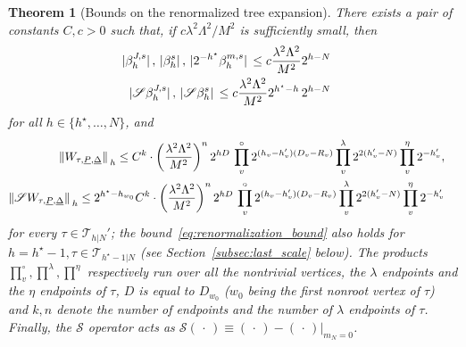 \documentclass[a4paper, 11pt]{article}
\newcommand{\cutoff}{\Lambda}								%
\newcommand{\trees}{\mathcal{T}}							%
\theoremstyle{thm}
\newtheorem{theorem}{Theorem}
\begin{document}
\begin{theorem}[Bounds on the renormalized tree expansion]
\label{th:renormalization_bound}
There exists a pair of constants $C, c > 0$ such that, if $c \lambda^2 \cutoff^2/M^2$ is sufficiently small, then
\begin{align}
\begin{split}
\label{eq:boundedness_beta_functions}
\abs*{\beta^{J, s}_h}, \, \abs*{\beta^s_h}, \, \abs*{2^{-h^\star} \beta^{m, s}_h} & \le c \frac{\lambda^2 \cutoff^2}{M^2} 2^{h - N}
\end{split} \\
\begin{split}
\label{eq:boundedness_beta_functions_zero_mass}
\abs*{\mathscr{S} \beta^{J, s}_h}, \, \abs*{\mathscr{S} \beta^s_h} & \le c \frac{\lambda^2 \cutoff^2}{M^2} 2^{h^\star - h} \, 2^{h - N}
\end{split}
\end{align}
for all $h \in \lbrace h^\star, \dots, N \rbrace$, and
\begin{align}
\begin{split}
\label{eq:renormalization_bound}
\norm*{W_{\tau, \underline{P}, \underline{\Delta}}}_h & \le C^k \cdot \left( \frac{\lambda^2 \cutoff^2}{M^2} \right)^n 2^{hD} \, \prod_v^\circ 2^{(h_v - h'_v)(D_v - R_v)} \prod^\lambda_v 2^{2(h'_v - N)} \prod^\eta_v 2^{-h'_v},
\end{split} \\
\begin{split}
\label{eq:renormalization_bound_zero_mass}
\norm*{\mathscr{S} W_{\tau, \underline{P}, \underline{\Delta}}}_h & \le 2^{h^\star - h_{w_0}} C^k \cdot \left( \frac{\lambda^2 \cutoff^2}{M^2} \right)^n 2^{hD} \, \prod_v^\circ 2^{(h_v - h'_v)(D_v - R_v)} \prod^\lambda_v 2^{2(h'_v - N)} \prod^\eta_v 2^{-h'_v}
\end{split}
\end{align}
for every $\tau \in \trees_{h|N}'$; the bound~\eqref{eq:renormalization_bound} also holds for $h = h^\star - 1, \tau \in \trees_{h^\star - 1|N}$ (see Section~\ref{subsec:last_scale} below). The products $\prod_v^\circ, \prod^\lambda, \prod^\eta$ respectively run over all the nontrivial vertices, the $\lambda$ endpoints and the $\eta$ endpoints of $\tau$, $D$ is equal to $D_{w_0}$ ($w_0$ being the first nonroot vertex of $\tau$) and $k, n$ denote the number of endpoints and the number of $\lambda$ endpoints of $\tau$. Finally, the $\mathscr{S}$ operator acts as $\mathscr{S}(\, \cdot \,) \equiv (\, \cdot \,) - (\, \cdot \,) \vert_{m_N = 0}$.
\end{theorem}
\end{document}
